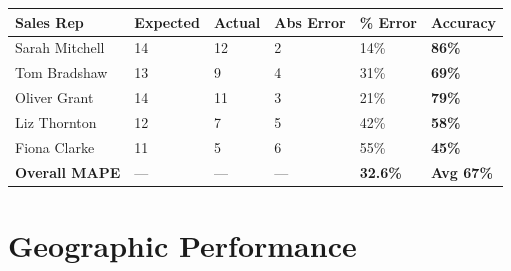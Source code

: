 \documentclass[12pt,a4paper]{report}
\newcommand{\badgegreen}[1]{\colorbox{aspcvgreen!20}{\color{aspcvgreen}\small\textbf{#1}}}
\newcommand{\badgeorange}[1]{\colorbox{aspcvorange!20}{\color{aspcvorange}\small\textbf{#1}}}
\newcommand{\badgered}[1]{\colorbox{aspcvred!20}{\color{aspcvred}\small\textbf{#1}}}
\newcommand{\badgeblue}[1]{\colorbox{aspcvaccent!20}{\color{aspcvaccent}\small\textbf{#1}}}
\begin{document}
\vspace{4pt}
\begin{center}
\begin{tabular}{L{3.2cm} C{2cm} C{2cm} C{2cm} C{2cm} C{2cm}}
\toprule
{}
\color{white}\textbf{Sales Rep} &
\color{white}\textbf{Expected} &
\color{white}\textbf{Actual} &
\color{white}\textbf{Abs Error} &
\color{white}\textbf{\% Error} &
\color{white}\textbf{Accuracy} \\
\midrule
{} Sarah Mitchell & 14 & 12 & 2 & 14\% & \badgegreen{86\%} \\
Tom Bradshaw   & 13 & 9  & 4 & 31\% & \badgeorange{69\%} \\
 Oliver Grant   & 14 & 11 & 3 & 21\% & \badgeorange{79\%} \\
Liz Thornton   & 12 & 7  & 5 & 42\% & \badgered{58\%} \\
 Fiona Clarke   & 11 & 5  & 6 & 55\% & \badgered{45\%} \\
\midrule
{}
\textbf{Overall MAPE} & --- & --- & --- & \textbf{32.6\%} & \badgeblue{Avg 67\%} \\
\bottomrule
\end{tabular}
\end{center}

\clearpage

\section{Geographic Performance}
\end{document}
